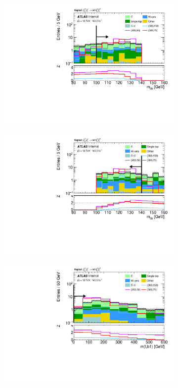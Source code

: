 \begin{figure}
\begin{subfigure}[b]{0.4\linewidth}
		\centering\includegraphics[width=\textwidth]{n1_SRLM_mct_bins/mbb_lower.pdf}
		\caption{\label{fig:Wh_reopt_second_round_n1_srlm_mbb_lower}}
	\end{subfigure}%
	\begin{subfigure}[b]{0.4\linewidth}
		\centering\includegraphics[width=\textwidth]{n1_SRLM_mct_bins/mbb_upper.pdf}
		\caption{\label{fig:Wh_reopt_second_round_n1_srlm_mbb_upper}}
	\end{subfigure}
	\begin{subfigure}[b]{0.4\linewidth}
		\centering\includegraphics[width=\textwidth]{n1_SRLM_mct_bins/mlb1.pdf}

\end{subfigure}
\end{figure}

